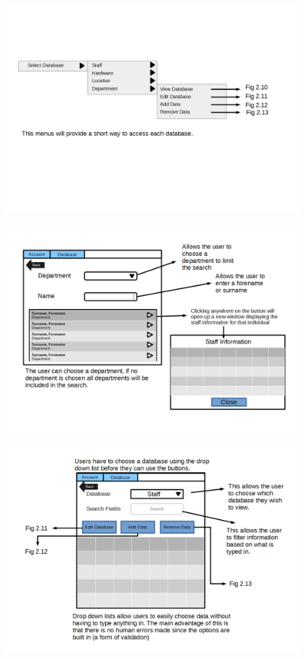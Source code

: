 \begin{figure}[H]
\includegraphics[width=\textwidth,angle=90]{GUI_Design8.jpg}
\caption{}
\end{figure}

\begin{figure}[H]
\includegraphics[width=\textwidth,angle=90]{GUI_Design9.jpg}
\caption{}
\end{figure}

\begin{figure}[H]
\includegraphics[width=\textwidth,angle=90]{GUI_Design10.jpg}
\caption{}
\end{figure}

